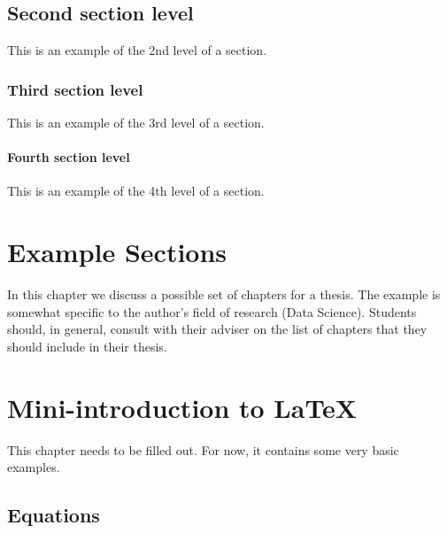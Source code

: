 \subsection{Second section level}
This is an example of the 2nd level of a section.

\subsubsection{Third section level}
This is an example of the 3rd level of a section.

\paragraph{Fourth section level}
This is an example of the 4th level of a section.


\section{Example Sections}\label{sec:example_sections}

In this chapter we discuss a possible set of chapters for a thesis. The example is somewhat specific to the author's field of research (Data Science). Students should, in general, consult with their adviser on the list of chapters that they should include in their thesis.


\section{Mini-introduction to LaTeX}\label{sec:latex}

This chapter needs to be filled out. For now, it contains some very basic examples.


\subsection{Equations}\label{sec:latex:equations}

